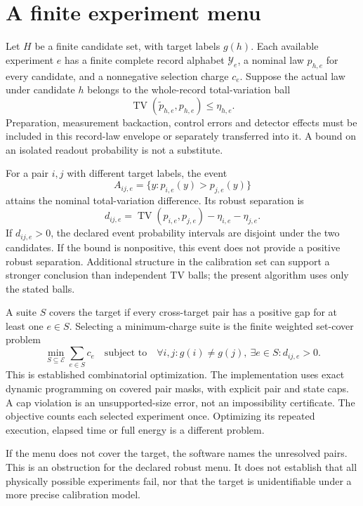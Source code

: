 \section{A finite experiment menu}
Let $H$ be a finite candidate set, with target labels $g(h)$. Each available experiment $e$ has a finite complete record alphabet $\mathcal Y_e$, a nominal law $p_{h,e}$ for every candidate, and a nonnegative selection charge $c_e$. Suppose the actual law under candidate $h$ belongs to the whole-record total-variation ball
\[
 \operatorname{TV}(\widetilde p_{h,e},p_{h,e})\le\eta_{h,e}.
\]
Preparation, measurement backaction, control errors and detector effects must be included in this record-law envelope or separately transferred into it. A bound on an isolated readout probability is not a substitute.

For a pair $i,j$ with different target labels, the event
\[
 A_{ij,e}=\{y:p_{i,e}(y)>p_{j,e}(y)\}
\]
attains the nominal total-variation difference. Its robust separation is
\[
 d_{ij,e}=\operatorname{TV}(p_{i,e},p_{j,e})-\eta_{i,e}-\eta_{j,e}.
\]
If $d_{ij,e}>0$, the declared event probability intervals are disjoint under the two candidates. If the bound is nonpositive, this event does not provide a positive robust separation. Additional structure in the calibration set can support a stronger conclusion than independent TV balls; the present algorithm uses only the stated balls.

A suite $S$ covers the target if every cross-target pair has a positive gap for at least one $e\in S$. Selecting a minimum-charge suite is the finite weighted set-cover problem
\[
 \min_{S\subseteq\mathcal E}\sum_{e\in S}c_e
 \quad\text{subject to}\quad
 \forall i,j:g(i)\ne g(j),\ \exists e\in S:d_{ij,e}>0.
\]
This is established combinatorial optimization. The implementation uses exact dynamic programming on covered pair masks, with explicit pair and state caps. A cap violation is an unsupported-size error, not an impossibility certificate. The objective counts each selected experiment once. Optimizing its repeated execution, elapsed time or full energy is a different problem.

If the menu does not cover the target, the software names the unresolved pairs. This is an obstruction for the declared robust menu. It does not establish that all physically possible experiments fail, nor that the target is unidentifiable under a more precise calibration model.

